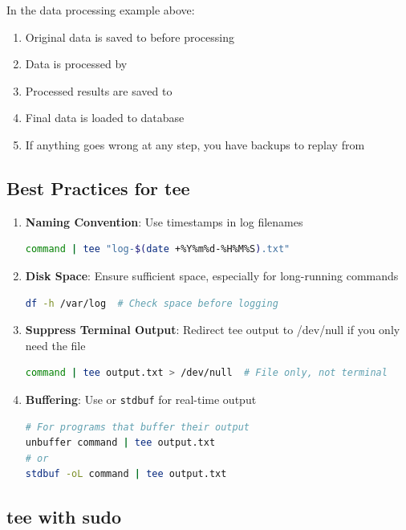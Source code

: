 In the data processing example above:
\begin{enumerate}
	\item Original data is saved to  before processing
	\item Data is processed by 
	\item Processed results are saved to 
	\item Final data is loaded to database
	\item If anything goes wrong at any step, you have backups to replay from
\end{enumerate}

\subsection{Best Practices for tee}

\begin{enumerate}
	\item \textbf{Naming Convention}: Use timestamps in log filenames
	      \begin{lstlisting}[language=bash]
command | tee "log-$(date +%Y%m%d-%H%M%S).txt"
    \end{lstlisting}

	\item \textbf{Disk Space}: Ensure sufficient space, especially for long-running commands
	      \begin{lstlisting}[language=bash]
df -h /var/log  # Check space before logging
    \end{lstlisting}

	\item \textbf{Suppress Terminal Output}: Redirect tee output to /dev/null if you only need the file
	      \begin{lstlisting}[language=bash]
command | tee output.txt > /dev/null  # File only, not terminal
    \end{lstlisting}

	\item \textbf{Buffering}: Use  or \texttt{stdbuf} for real-time output
	      \begin{lstlisting}[language=bash]
# For programs that buffer their output
unbuffer command | tee output.txt
# or
stdbuf -oL command | tee output.txt
    \end{lstlisting}
\end{enumerate}

\subsection{tee with sudo}


